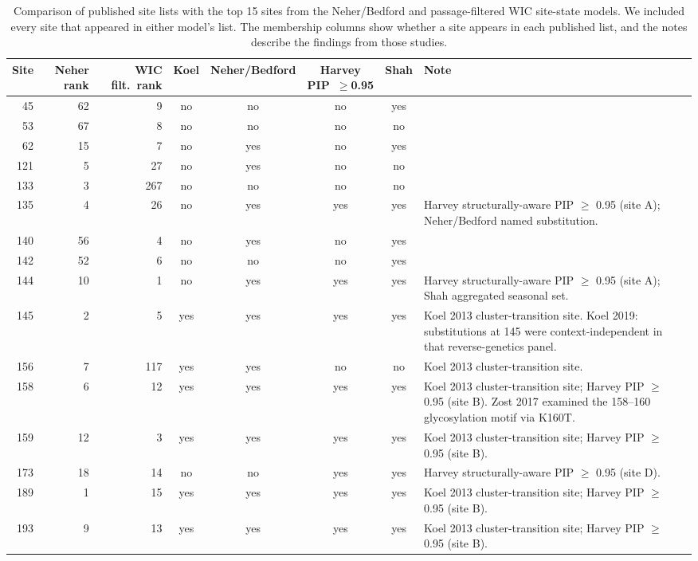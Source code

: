 \begin{table}[!h]
\centering
\caption{Comparison of published site lists with the top 15 sites from the Neher/Bedford and passage-filtered WIC site-state models. We included every site that appeared in either model's list. The membership columns show whether a site appears in each published list, and the notes describe the findings from those studies.}
\label{tab:si-literature-overlap}
\footnotesize
\setlength{\tabcolsep}{3pt}
\begin{tabular*}{\textwidth}{@{\extracolsep{\fill}}rrrccccp{6.6cm}}
\toprule
Site & Neher rank & WIC filt.\ rank & Koel & Neher/Bedford & Harvey PIP~$\geq$0.95 & Shah & Note \\
\midrule
45 & 62 & 9 & no & no & no & yes &  \\
53 & 67 & 8 & no & no & no & no &  \\
62 & 15 & 7 & no & yes & no & yes &  \\
121 & 5 & 27 & no & yes & no & no &  \\
133 & 3 & 267 & no & no & no & no &  \\
135 & 4 & 26 & no & yes & yes & yes & Harvey structurally-aware PIP $\geq$ 0.95 (site A); Neher/Bedford named substitution. \\
140 & 56 & 4 & no & yes & no & yes &  \\
142 & 52 & 6 & no & no & no & yes &  \\
144 & 10 & 1 & no & yes & yes & yes & Harvey structurally-aware PIP $\geq$ 0.95 (site A); Shah aggregated seasonal set. \\
145 & 2 & 5 & yes & yes & yes & yes & Koel 2013 cluster-transition site. Koel 2019: substitutions at 145 were context-independent in that reverse-genetics panel. \\
156 & 7 & 117 & yes & yes & no & no & Koel 2013 cluster-transition site. \\
158 & 6 & 12 & yes & yes & yes & yes & Koel 2013 cluster-transition site; Harvey PIP $\geq$ 0.95 (site B). Zost 2017 examined the 158--160 glycosylation motif via K160T. \\
159 & 12 & 3 & yes & yes & yes & yes & Koel 2013 cluster-transition site; Harvey PIP $\geq$ 0.95 (site B). \\
173 & 18 & 14 & no & no & yes & yes & Harvey structurally-aware PIP $\geq$ 0.95 (site D). \\
189 & 1 & 15 & yes & yes & yes & yes & Koel 2013 cluster-transition site; Harvey PIP $\geq$ 0.95 (site B). \\
193 & 9 & 13 & yes & yes & yes & yes & Koel 2013 cluster-transition site; Harvey PIP $\geq$ 0.95 (site B). \\

\end{tabular*}
\end{table}

